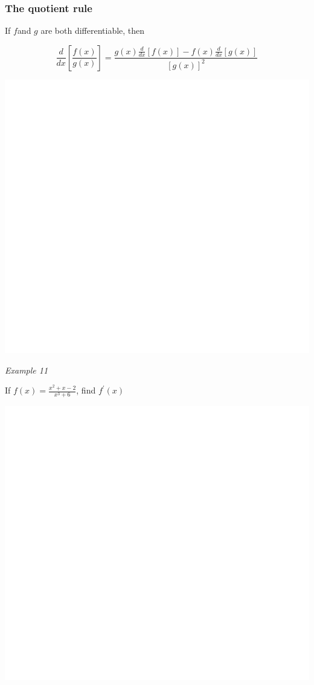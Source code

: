\documentclass[]{book}
\begin{document}
\hypertarget{the-quotient-rule}{%
\subsubsection{The quotient rule}\label{the-quotient-rule}}

If \(f\)and \(g\) are both differentiable, then

\[\frac{d}{dx}[\frac{f(x)}{g(x)}]= \frac{g(x)\frac{d}{dx}[f(x)]- f(x)\frac{d}{dx}[g(x)]}{[g(x)]^2}\]

\begin{center}\includegraphics[width=1\linewidth]{figure/LB19-1} \end{center}

\emph{Example 11}

If \(f(x)=\frac{x^2+x-2}{x^3+6}\), find \(f^\prime(x)\)

\begin{center}\includegraphics[width=1\linewidth]{figure/LB20-1} \end{center}
\end{document}
